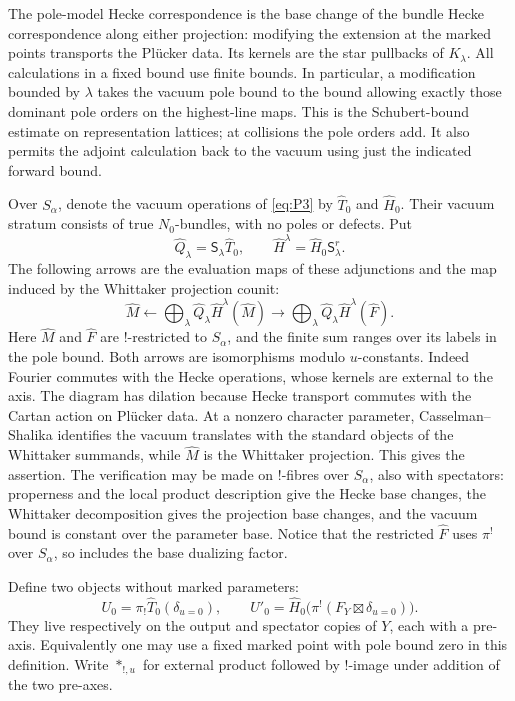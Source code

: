 The pole-model Hecke correspondence is the base change of the bundle
Hecke correspondence along either projection: modifying the extension
at the marked points transports the Pl\"ucker data.  Its kernels are
the star pullbacks of $K_\lambda$.  All calculations in a fixed bound
use finite bounds.  In particular, a modification bounded by
$\lambda$ takes the vacuum pole bound to the bound allowing exactly
those dominant pole orders on the highest-line maps.  This is the
Schubert-bound estimate on representation lattices; at collisions
the pole orders add.  It also permits the adjoint calculation back
to the vacuum using just the indicated forward bound.

Over $S_\alpha$, denote the vacuum operations of \eqref{eq:P3} by
$\widehat T_0$ and $\widehat H_0$.  Their vacuum stratum consists of
true $N_0$-bundles, with no poles or defects.  Put
\[
 \widehat Q_\lambda=\mathsf S_\lambda\widehat T_0,
 \qquad
 \widehat H^\lambda=\widehat H_0\mathsf S_\lambda^r.
\]
The following arrows are the evaluation maps of these adjunctions and
the map induced by the Whittaker projection counit:
\begin{equation}
 \widehat M\longleftarrow
 \bigoplus_\lambda\widehat Q_\lambda
                    \widehat H^\lambda(\widehat M)
 \longrightarrow
 \bigoplus_\lambda\widehat Q_\lambda
                    \widehat H^\lambda(\widehat F).
 \label{eq:P8}
\end{equation}
Here $\widehat M$ and $\widehat F$ are $!$-restricted to $S_\alpha$,
and the finite sum ranges over its labels in the pole bound.  Both
arrows are isomorphisms modulo $u$-constants.  Indeed Fourier commutes
with the Hecke operations, whose kernels are external to the axis.
The diagram has dilation because Hecke transport commutes with the
Cartan action on Pl\"ucker data.  At a nonzero character parameter,
Casselman--Shalika identifies the vacuum translates with the standard
objects of the Whittaker summands, while $\widehat M$ is the Whittaker
projection.  This gives the assertion.  The verification may be made
on $!$-fibres over $S_\alpha$, also with spectators: properness and
the local product description give the Hecke base changes, the
Whittaker decomposition gives the projection base changes, and the
vacuum bound is constant over the parameter base.  Notice that the
restricted $\widehat F$ uses $\pi^!$ over $S_\alpha$, so includes the
base dualizing factor.

Define two objects without marked parameters:
\begin{equation}
 U_0=\pi_!\widehat T_0(\delta_{u=0}),\qquad
 U'_0=\widehat H_0
       \bigl(\pi^!(F_Y\boxtimes\delta_{u=0})\bigr).
 \label{eq:P9}
\end{equation}
They live respectively on the output and spectator copies of $Y$,
each with a pre-axis.  Equivalently one may use a fixed marked point
with pole bound zero in this definition.  Write $*_{!,u}$ for external
product followed by $!$-image under addition of the two pre-axes.

